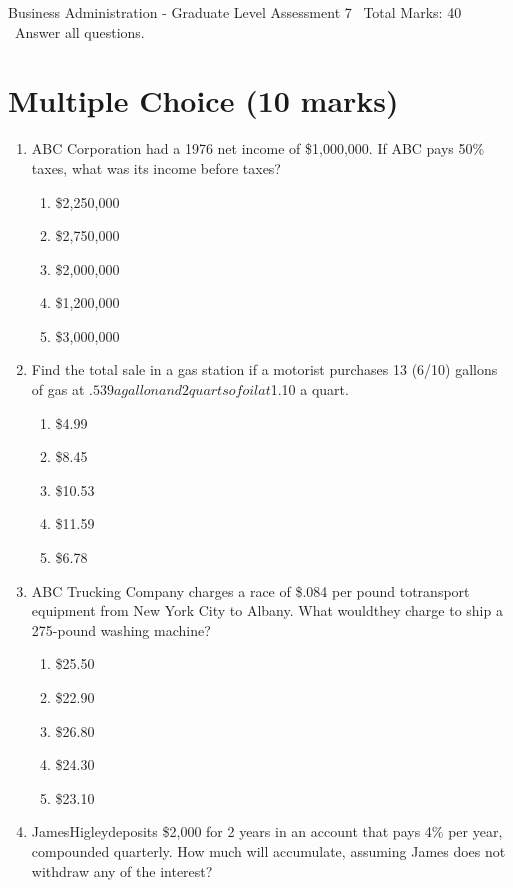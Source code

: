 \documentclass[12pt]{article}
\begin{document}
\begin{center}
Business Administration - Graduate Level Assessment 7 \
Total Marks: 40 \
Answer all questions.
\end{center}

\section*{Multiple Choice (10 marks)}
\begin{enumerate}[label=\arabic*.]
\item ABC Corporation had a 1976 net income of \$1,000,000. If ABC pays 50\% taxes, what was its income before taxes?
\begin{enumerate}[label=(\alph*)]
    \item \$2,250,000
    \item \$2,750,000
    \item \$2,000,000
    \item \$1,200,000
    \item \$3,000,000
\end{enumerate}
\item Find the total sale in a gas station if a motorist purchases 13 (6/10) gallons of gas at $.539 a gallon and 2 quarts of oil at $1.10 a quart.
\begin{enumerate}[label=(\alph*)]
    \item \$4.99
    \item \$8.45
    \item \$10.53
    \item \$11.59
    \item \$6.78
\end{enumerate}
\item ABC Trucking Company charges a race of \$.084 per pound totransport equipment from New York City to Albany. What wouldthey charge to ship a 275-pound washing machine?
\begin{enumerate}[label=(\alph*)]
    \item \$25.50
    \item \$22.90
    \item \$26.80
    \item \$24.30
    \item \$23.10
\end{enumerate}
\item JamesHigleydeposits \$2,000 for 2 years in an account that pays 4\% per year, compounded quarterly. How much will accumulate, assuming James does not withdraw any of the interest?
\begin{enumerate}[label=(\alph*)]

\end{enumerate}
\end{enumerate}
\end{document}
